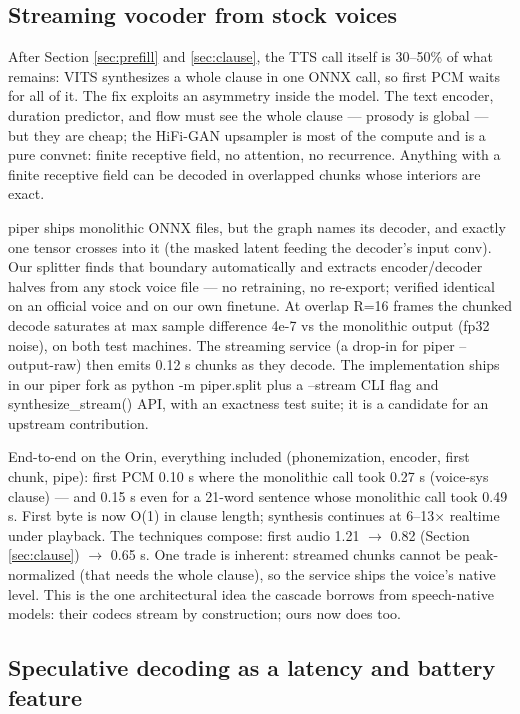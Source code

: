\documentclass{article}
\begin{document}
\subsection{Streaming vocoder from stock voices}
\label{sec:vocoder}

After Section \ref{sec:prefill} and \ref{sec:clause}, the TTS call itself is 30--50\% of what remains: VITS synthesizes a whole clause in one ONNX call, so first PCM waits for all of it. The fix exploits an asymmetry inside the model. The text encoder, duration predictor, and flow must see the whole clause --- prosody is global --- but they are cheap; the HiFi-GAN upsampler is most of the compute and is a pure convnet: finite receptive field, no attention, no recurrence. Anything with a finite receptive field can be decoded in overlapped chunks whose interiors are exact.

piper ships monolithic ONNX files, but the graph names its decoder, and exactly one tensor crosses into it (the masked latent feeding the decoder's input conv). Our splitter finds that boundary automatically and extracts encoder/decoder halves from any stock voice file --- no retraining, no re-export; verified identical on an official voice and on our own finetune. At overlap R=16 frames the chunked decode saturates at max sample difference 4e-7 vs the monolithic output (fp32 noise), on both test machines. The streaming service (a drop-in for piper --output-raw) then emits 0.12 s chunks as they decode. The implementation ships in our piper fork as python -m piper.split plus a --stream CLI flag and synthesize\_stream() API, with an exactness test suite; it is a candidate for an upstream contribution.

End-to-end on the Orin, everything included (phonemization, encoder, first chunk, pipe): first PCM 0.10 s where the monolithic call took 0.27 s (voice-sys clause) --- and 0.15 s even for a 21-word sentence whose monolithic call took 0.49 s. First byte is now O(1) in clause length; synthesis continues at 6--13× realtime under playback. The techniques compose: first audio 1.21 $\rightarrow$ 0.82 (Section \ref{sec:clause}) $\rightarrow$ 0.65 s. One trade is inherent: streamed chunks cannot be peak-normalized (that needs the whole clause), so the service ships the voice's native level. This is the one architectural idea the cascade borrows from speech-native models: their codecs stream by construction; ours now does too.

\subsection{Speculative decoding as a latency and battery feature}
\label{sec:speculative}
\end{document}

